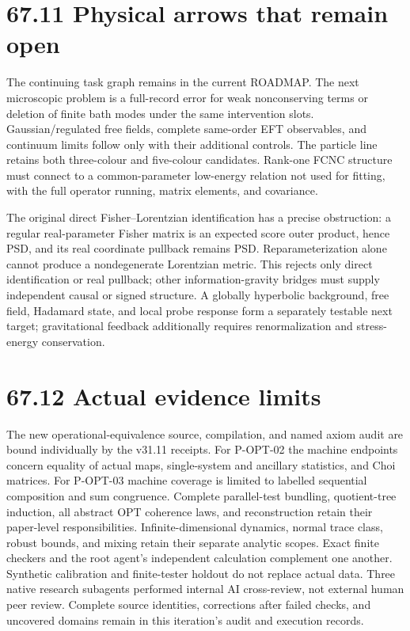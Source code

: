 \documentclass[
  11pt,
  oneside]{book}
\begin{document}
\section{67.11 Physical arrows that remain open}

The continuing task graph remains in the current ROADMAP. The next
microscopic problem is a full-record error for weak nonconserving terms
or deletion of finite bath modes under the same intervention slots.
Gaussian/regulated free fields, complete same-order EFT observables, and
continuum limits follow only with their additional controls. The
particle line retains both three-colour and five-colour candidates.
Rank-one FCNC structure must connect to a common-parameter low-energy
relation not used for fitting, with the full operator running, matrix
elements, and covariance.

The original direct Fisher--Lorentzian identification has a precise
obstruction: a regular real-parameter Fisher matrix is an expected score
outer product, hence PSD, and its real coordinate pullback remains PSD.
Reparameterization alone cannot produce a nondegenerate Lorentzian
metric. This rejects only direct identification or real pullback; other
information-gravity bridges must supply independent causal or signed
structure. A globally hyperbolic background, free field, Hadamard state,
and local probe response form a separately testable next target;
gravitational feedback additionally requires renormalization and
stress-energy conservation.

\section{67.12 Actual evidence limits}

The new operational-equivalence source, compilation, and named axiom
audit are bound individually by the v31.11 receipts. For P-OPT-02 the
machine endpoints concern equality of actual maps, single-system and
ancillary statistics, and Choi matrices. For P-OPT-03 machine coverage
is limited to labelled sequential composition and sum congruence.
Complete parallel-test bundling, quotient-tree induction, all abstract
OPT coherence laws, and reconstruction retain their paper-level
responsibilities. Infinite-dimensional dynamics, normal trace class,
robust bounds, and mixing retain their separate analytic scopes. Exact
finite checkers and the root agent's independent calculation complement
one another. Synthetic calibration and finite-tester holdout do not
replace actual data. Three native research subagents performed internal
AI cross-review, not external human peer review. Complete source
identities, corrections after failed checks, and uncovered domains
remain in this iteration's audit and execution records.
\end{document}
